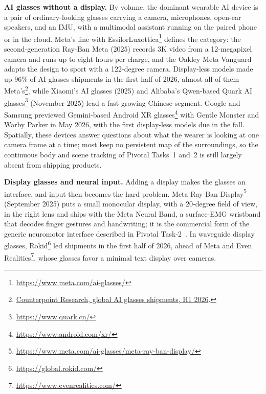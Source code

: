 \textbf{AI glasses without a display.} By volume, the dominant wearable AI device is a pair of ordinary-looking glasses carrying a camera, microphones, open-ear speakers, and an IMU, with a multimodal assistant running on the paired phone or in the cloud. Meta's line with EssilorLuxottica\footnote{\url{https://www.meta.com/ai-glasses/}} defines the category: the second-generation Ray-Ban Meta (2025) records 3K video from a 12-megapixel camera and runs up to eight hours per charge, and the Oakley Meta Vanguard adapts the design to sport with a 122-degree camera. Display-less models made up 96\% of AI-glasses shipments in the first half of 2026, almost all of them Meta's\footnote{\href{https://counterpointresearch.com/en/insights/global-ai-glasses-shipments-surge-263-percent-yoy-with-display-less-ai-glasses}{Counterpoint Research, global AI glasses shipments, H1 2026}.}, while Xiaomi's AI glasses (2025) and Alibaba's Qwen-based Quark AI glasses\footnote{\url{https://www.quark.cn/}} (November 2025) lead a fast-growing Chinese segment. Google and Samsung previewed Gemini-based Android XR glasses\footnote{\url{https://www.android.com/xr/}} with Gentle Monster and Warby Parker in May 2026, with the first display-less models due in the fall. Spatially, these devices answer questions about what the wearer is looking at one camera frame at a time; most keep no persistent map of the surroundings, so the continuous body and scene tracking of Pivotal Tasks~1 and~2 is still largely absent from shipping products.

\textbf{Display glasses and neural input.} Adding a display makes the glasses an interface, and input then becomes the hard problem. Meta Ray-Ban Display\footnote{\url{https://www.meta.com/ai-glasses/meta-ray-ban-display/}} (September 2025) puts a small monocular display, with a 20-degree field of view, in the right lens and ships with the Meta Neural Band, a surface-EMG wristband that decodes finger gestures and handwriting; it is the commercial form of the generic neuromotor interface described in Pivotal Task-2~\cite{kaifosh2025neuromotor}. In waveguide display glasses, Rokid\footnote{\url{https://global.rokid.com/}} led shipments in the first half of 2026, ahead of Meta and Even Realities\footnote{\url{https://www.evenrealities.com/}}, whose glasses favor a minimal text display over cameras.

